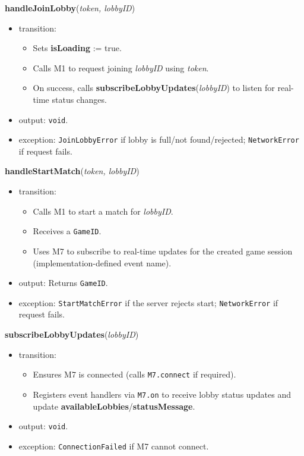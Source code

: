\documentclass[12pt, titlepage]{article}
\begin{document}
\noindent\textbf{handleJoinLobby}(\textit{token, lobbyID})
\begin{itemize}
    \item transition:
    \begin{itemize}
        \item Sets \textbf{isLoading} := true.
        \item Calls M1 to request joining \textit{lobbyID} using \textit{token}.
        \item On success, calls \textbf{subscribeLobbyUpdates}(\textit{lobbyID}) to listen for real-time status changes.
    \end{itemize}
    \item output: \texttt{void}.
    \item exception: \texttt{JoinLobbyError} if lobby is full/not found/rejected; \texttt{NetworkError} if request fails.
\end{itemize}

\noindent\textbf{handleStartMatch}(\textit{token, lobbyID})
\begin{itemize}
    \item transition:
    \begin{itemize}
        \item Calls M1 to start a match for \textit{lobbyID}.
        \item Receives a \texttt{GameID}.
        \item Uses M7 to subscribe to real-time updates for the created game session (implementation-defined event name).
    \end{itemize}
    \item output: Returns \texttt{GameID}.
    \item exception: \texttt{StartMatchError} if the server rejects start; \texttt{NetworkError} if request fails.
\end{itemize}

\noindent\textbf{subscribeLobbyUpdates}(\textit{lobbyID})
\begin{itemize}
    \item transition:
    \begin{itemize}
        \item Ensures M7 is connected (calls \texttt{M7.connect} if required).
        \item Registers event handlers via \texttt{M7.on} to receive lobby status updates and update \textbf{availableLobbies}/\textbf{statusMessage}.
    \end{itemize}
    \item output: \texttt{void}.
    \item exception: \texttt{ConnectionFailed} if M7 cannot connect.
\end{itemize}
\end{document}

